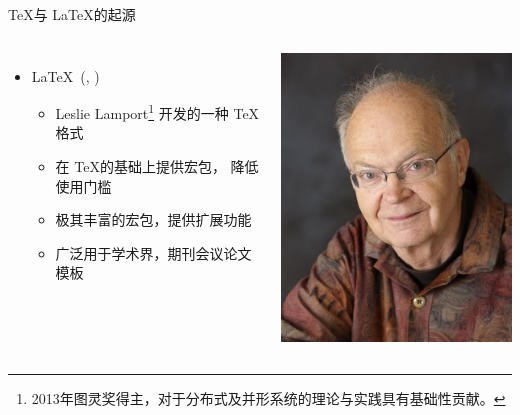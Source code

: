 \begin{frame}[fragile]{\TeX 与 \LaTeX 的起源}
\begin{columns}[T]
\begin{itemize}
        \vspace{2em}
      \item \LaTeX\ (, )
        \begin{itemize}
          \item Leslie Lamport\footnote{2013年图灵奖得主，对于分布式及并形系统的理论与实践具有基础性贡献。} 开发的一种 \TeX 格式
          \item 在 \TeX 的基础上提供宏包， 降低使用门槛
          \item 极其丰富的宏包，提供扩展功能
          \item 广泛用于学术界，期刊会议论文模板
        \end{itemize}
    \end{itemize}
    \vspace*{-5mm}
    \hspace{-10mm} \includegraphics[width=\textwidth]{Knuth.jpg}


\end{columns}
\end{frame}
